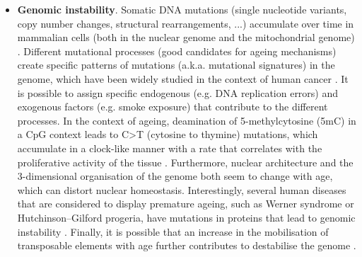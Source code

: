 \begin{itemize}
	
	\item \textbf{Genomic instability}. Somatic DNA mutations (single nucleotide variants, copy number changes, structural rearrangements, ...) accumulate over time in mammalian cells (both in the nuclear genome and the mitochondrial genome) \cite{Martincorena2018,Larsson2010}. Different mutational processes (good candidates for ageing mechanisms) create specific patterns of mutations (a.k.a. mutational signatures) in the genome, which have been widely studied in the context of human cancer \cite{Alexandrov2014}. It is possible to assign specific endogenous (e.g. DNA replication errors) and exogenous factors (e.g. smoke exposure) that contribute to the different processes. In the context of ageing, deamination of 5-methylcytosine (\acrshort{5mC}) in a \acrshort{CpG} context leads to C>T (cytosine to thymine) mutations, which accumulate in a clock-like manner with a rate that correlates with the proliferative activity of the tissue \cite{Alexandrov2015}. Furthermore, nuclear architecture and the 3-dimensional organisation of the genome both seem to change with age, which can distort nuclear homeostasis. Interestingly, several human diseases that are considered to display premature ageing, such as Werner syndrome or Hutchinson–Gilford progeria, have mutations in proteins that lead to genomic instability \cite{Oberdoerffer2007}. Finally, it is possible that an increase in the mobilisation of transposable elements with age further contributes to destabilise the genome \cite{Orr2016}.
	

\end{itemize}
